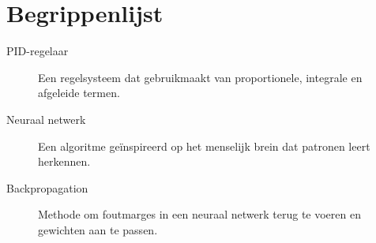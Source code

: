 \section*{Begrippenlijst}
\begin{description}
  \item[PID-regelaar] Een regelsysteem dat gebruikmaakt van proportionele, integrale en afgeleide termen.
  \item[Neuraal netwerk] Een algoritme geïnspireerd op het menselijk brein dat patronen leert herkennen.
  \item[Backpropagation] Methode om foutmarges in een neuraal netwerk terug te voeren en gewichten aan te passen.
\end{description}